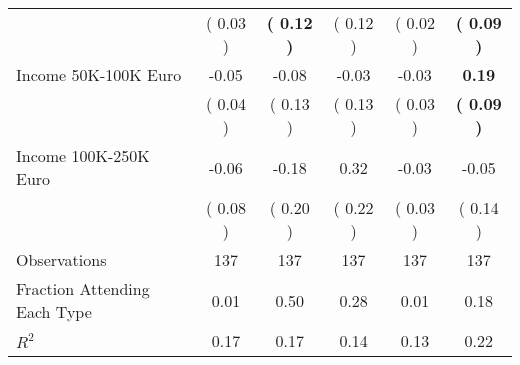 \begin{table}[H]
{\begin{tabular}{lccccc}
\quad  & (     0.03 ) & \textbf{(     0.12 )}  & (     0.12 )  & (     0.02 ) & \textbf{(     0.09 )} \\
\quad Income 50K-100K Euro &     -0.05 &     -0.08 &     -0.03 &     -0.03 & \textbf{     0.19} \\
\quad  & (     0.04 ) & (     0.13 )  & (     0.13 )  & (     0.03 ) & \textbf{(     0.09 )} \\
\quad Income 100K-250K Euro &     -0.06 &     -0.18 &      0.32 &     -0.03 &     -0.05 \\
\quad  & (     0.08 ) & (     0.20 )  & (     0.22 )  & (     0.03 ) & (     0.14 ) \\
\midrule
Observations & 137 & 137 & 137 & 137 & 137 \\
Fraction Attending Each Type &      0.01 &      0.50 &      0.28 &      0.01 &      0.18 \\
\midrule
$ R^2$ &      0.17 &      0.17 &      0.14 &      0.13 &      0.22 \\
\bottomrule
\end{tabular}}
\end{table}

